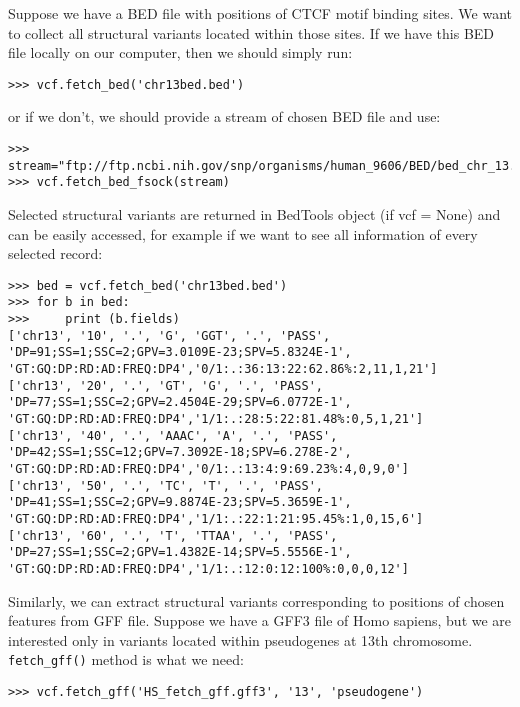 \noindent Suppose we have a BED file with positions of CTCF motif binding sites. We want to collect all structural variants
located within those sites. If we have this BED file locally on our computer, then we should simply run:


\begin{verbatim}
>>> vcf.fetch_bed('chr13bed.bed')

\end{verbatim}

\noindent or if we don't, we should provide a stream of chosen BED file and use:

\begin{verbatim}
>>> stream="ftp://ftp.ncbi.nih.gov/snp/organisms/human_9606/BED/bed_chr_13.bed.gz"
>>> vcf.fetch_bed_fsock(stream)

\end{verbatim}


\noindent Selected structural variants are returned in BedTools object (if vcf = None) and can be easily accessed, for example
if we want to see all information of every selected record:


\begin{verbatim}
>>> bed = vcf.fetch_bed('chr13bed.bed')
>>> for b in bed:
>>>     print (b.fields)
['chr13', '10', '.', 'G', 'GGT', '.', 'PASS', 'DP=91;SS=1;SSC=2;GPV=3.0109E-23;SPV=5.8324E-1',
'GT:GQ:DP:RD:AD:FREQ:DP4','0/1:.:36:13:22:62.86%:2,11,1,21']
['chr13', '20', '.', 'GT', 'G', '.', 'PASS', 'DP=77;SS=1;SSC=2;GPV=2.4504E-29;SPV=6.0772E-1',
'GT:GQ:DP:RD:AD:FREQ:DP4','1/1:.:28:5:22:81.48%:0,5,1,21']
['chr13', '40', '.', 'AAAC', 'A', '.', 'PASS', 'DP=42;SS=1;SSC=12;GPV=7.3092E-18;SPV=6.278E-2',
'GT:GQ:DP:RD:AD:FREQ:DP4','0/1:.:13:4:9:69.23%:4,0,9,0']
['chr13', '50', '.', 'TC', 'T', '.', 'PASS', 'DP=41;SS=1;SSC=2;GPV=9.8874E-23;SPV=5.3659E-1',
'GT:GQ:DP:RD:AD:FREQ:DP4','1/1:.:22:1:21:95.45%:1,0,15,6']
['chr13', '60', '.', 'T', 'TTAA', '.', 'PASS', 'DP=27;SS=1;SSC=2;GPV=1.4382E-14;SPV=5.5556E-1',
'GT:GQ:DP:RD:AD:FREQ:DP4','1/1:.:12:0:12:100%:0,0,0,12']
\end{verbatim}


\noindent Similarly, we can extract structural variants corresponding to positions of chosen features from GFF file. Suppose
we have a GFF3 file of Homo sapiens, but we are interested only in variants located within pseudogenes
at 13th chromosome. \verb|fetch_gff()| method is what we need:


\begin{verbatim}
>>> vcf.fetch_gff('HS_fetch_gff.gff3', '13', 'pseudogene')
\end{verbatim}


